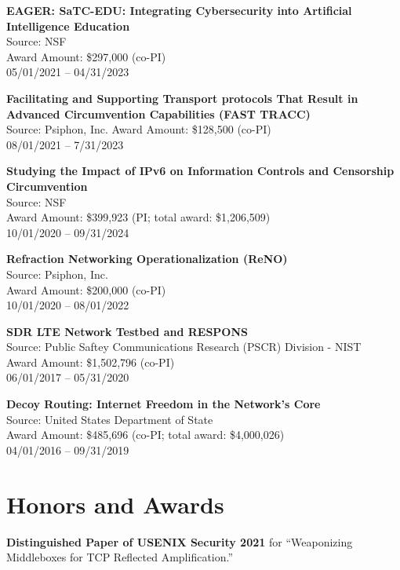 \documentclass[margin,11pt]{res} %
\begin{document}
\textbf{EAGER: SaTC-EDU: Integrating Cybersecurity into Artificial Intelligence Education} \\
Source: NSF \\
Award Amount: \$297,000 (co-PI) \\
05/01/2021 -- 04/31/2023


\textbf{Facilitating and Supporting Transport protocols That Result in Advanced Circumvention Capabilities (FAST TRACC)} \\
Source: Psiphon, Inc.
Award Amount: \$128,500 (co-PI) \\
08/01/2021 -- 7/31/2023

\textbf{Studying the Impact of IPv6 on Information Controls and Censorship Circumvention} \\
Source: NSF \\
Award Amount: \$399,923 (PI; total award: \$1,206,509) \\
10/01/2020 -- 09/31/2024

\textbf{Refraction Networking Operationalization (ReNO)} \\
Source: Psiphon, Inc. \\
Award Amount: \$200,000 (co-PI) \\
10/01/2020 -- 08/01/2022

\textbf{SDR LTE Network Testbed and RESPONS} \\
Source: Public Saftey Communications Research (PSCR) Division - NIST \\
Award Amount: \$1,502,796 (co-PI) \\
06/01/2017 -- 05/31/2020

\textbf{Decoy Routing: Internet Freedom in the Network's Core} \\
Source: United States Department of State \\
Award Amount: \$485,696 (co-PI; total award: \$4,000,026) \\
04/01/2016 -- 09/31/2019



\vspace{6pt}
\section{\large Honors and Awards}


    \textbf{Distinguished Paper of USENIX Security 2021}
    for ``Weaponizing Middleboxes for TCP Reflected Amplification.''
\end{document}
